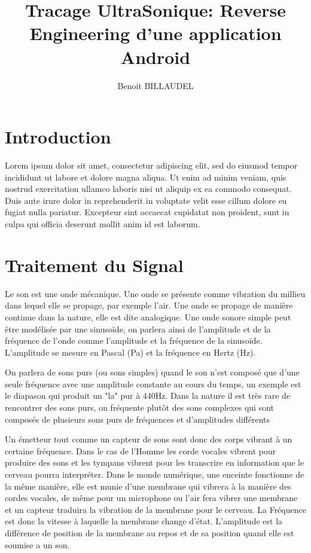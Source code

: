 \documentclass[12pt]{article}
\begin{document}
\title{Tracage UltraSonique: Reverse Engineering d'une application Android}
\author{Benoit BILLAUDEL}

\maketitle

\section*{Introduction}
Lorem ipsum dolor sit amet, consectetur adipiscing elit, sed do eiusmod tempor incididunt ut labore et dolore magna aliqua. Ut enim ad minim veniam, quis nostrud exercitation ullamco laboris nisi ut aliquip ex ea commodo consequat. Duis aute irure dolor in reprehenderit in voluptate velit esse cillum dolore eu fugiat nulla pariatur. Excepteur sint occaecat cupidatat non proident, sunt in culpa qui officia deserunt mollit anim id est laborum.

\section{Traitement du Signal}
Le son est une onde mécanique. Une onde se présente comme vibration du millieu dans lequel elle se propage, par exemple l'air.
Une onde se propage de manière continue dans la nature, elle est dite analogique. Une onde sonore simple peut être modélisée par une sinusoïde, on parlera ainsi de l'amplitude et de la fréquence de l'onde comme l'amplitude et la fréquence de la sinusoïde. L'amplitude se mesure en Pascal (Pa) et la fréquence en Hertz (Hz).

On parlera de sons purs (ou sons simples) quand le son n'est composé que d'une seule fréquence avec une amplitude constante au cours du temps, un exemple est le diapason qui produit un "la" pur à 440Hz.
Dans la nature il est très rare de rencontrer des sons purs, on fréquente plutôt des sons complexes qui sont composés de plusieurs sons purs de fréquences et d'amplitudes différents

Un émetteur tout comme un capteur de sons sont donc des corps vibrant à un certaine fréquence. Dans le cas de l'Homme les corde vocales vibrent pour produire des sons et les tympans vibrent pour les transcrire en information que le cerveau pourra interpréter. Dans le monde numérique, une enceinte fonctionne de la même manière, elle est munie d'une membrane qui vibrera à la manière des cordes vocales, de même pour un microphone ou l'air fera vibrer une membrane et un capteur traduira la vibration de la membrane pour le cerveau. La Fréquence est donc la vitesse à laquelle la membrane change d'état.
L'amplitude est la différence de position de la membrane au repos et de sa position quand elle est soumise a un son.
\end{document}
